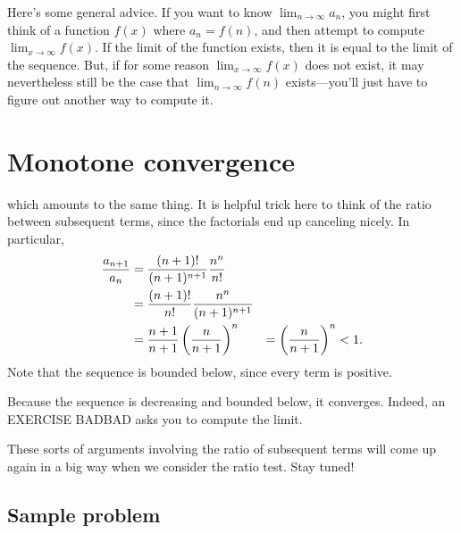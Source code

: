 \documentclass{ximera}
\begin{document}
Here's some general advice. If you want to know $\lim_{n\to\infty}
a_n$, you might first think of a function $f(x)$ where $a_n = f(n)$,
and then attempt to compute $\lim_{x\to\infty}f(x)$.  If the limit
of the function exists, then it is equal to the limit of the sequence.
But, if for some reason $\lim_{x\to\infty}f(x)$ does not exist, it
may nevertheless still be the case that $\lim_{n\to\infty}f(n)$
exists---you'll just have to figure out another way to compute it.

\section{Monotone convergence}

\begin{explanation}
which amounts to the same thing.  It is helpful trick here to think of
the ratio between subsequent terms, since the factorials end up
canceling nicely.  In particular,
\begin{align*}
  {a_{n+1}\over a_n} &= {(n+1)!\over (n+1)^{n+1}}{n^n\over n!} \\
  &= {(n+1)!\over n!}{n^n\over (n+1)^{n+1}} \\
  &= {n+1\over n+1}\left({n\over n+1}\right)^n
  &= \left({n\over n+1}\right)^n < 1.
\end{align*}
  Note that the sequence is bounded below, since every term is positive.

  Because the sequence is decreasing and bounded below, it converges.
  Indeed, an EXERCISE BADBAD asks you to compute the limit.
\end{explanation}

These sorts of arguments involving the ratio of subsequent terms will
come up again in a big way when we consider the ratio test.  Stay
tuned!

\subsection{Sample problem}
\end{document}
